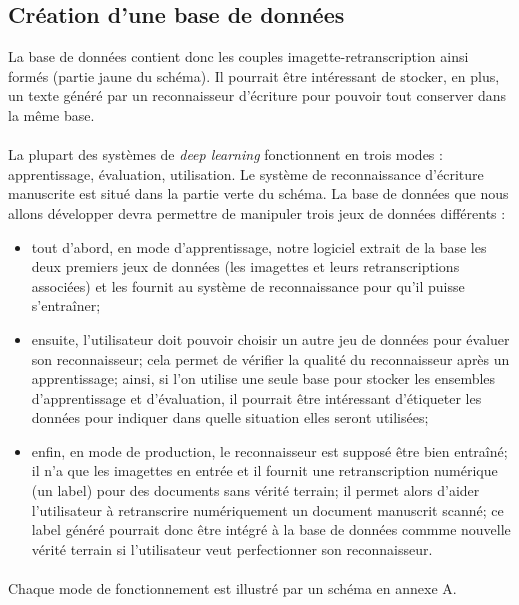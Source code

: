\subsection{Création d'une base de données}

La base de données contient donc les couples imagette-retranscription ainsi formés (partie jaune du schéma).
Il pourrait être intéressant de stocker, en plus, un texte généré par un reconnaisseur d’écriture pour
pouvoir tout conserver dans la même base.

\paragraph{}
La plupart des systèmes de \textit{deep learning} fonctionnent en trois modes : apprentissage, évaluation,
utilisation. Le système de reconnaissance d’écriture manuscrite est situé dans la partie verte du schéma.
La base de données que nous allons développer devra permettre de manipuler trois jeux de données différents : 

\begin{itemize}
\item tout d’abord, en mode d’apprentissage, notre logiciel extrait de la base les deux premiers jeux de données
(les imagettes et leurs retranscriptions associées) et les fournit au système de reconnaissance pour qu'il puisse s'entraîner;
\item ensuite, l'utilisateur doit pouvoir choisir un autre jeu de données pour évaluer son reconnaisseur; cela permet de vérifier
la qualité du reconnaisseur après un apprentissage; ainsi, si l'on utilise une seule base pour stocker les ensembles d’apprentissage
et d’évaluation, il pourrait être intéressant d’étiqueter les données pour indiquer dans quelle situation elles seront utilisées;
\item enfin, en mode de production, le reconnaisseur est supposé être bien entraîné; il n’a que les imagettes
en entrée et il fournit une retranscription numérique (un label) pour des documents sans vérité terrain;
il permet alors d’aider l’utilisateur à retranscrire numériquement un document manuscrit scanné; ce label généré pourrait donc
être intégré à la base de données commme nouvelle vérité terrain si l'utilisateur veut perfectionner son reconnaisseur.
\end{itemize}

\paragraph{}
Chaque mode de fonctionnement est illustré par un schéma en annexe A.

